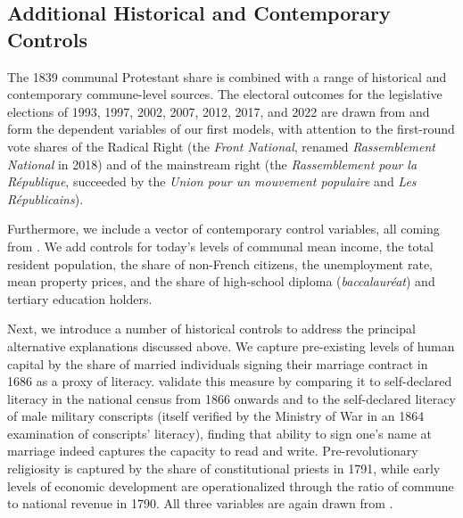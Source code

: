 \documentclass[12pt]{article}
\begin{document}
\subsection{Additional Historical and Contemporary Controls}

The 1839 communal Protestant share is combined with a range of historical and contemporary commune-level sources. The electoral outcomes for the legislative elections of 1993, 1997, 2002, 2007, 2012, 2017, and 2022 are drawn from \textcite{cageHistoryPoliticalConflict2025} and form the dependent variables of our first models, with attention to the first-round vote shares of the Radical Right (the \textit{Front National}, renamed \textit{Rassemblement National} in 2018) and of the mainstream right (the \textit{Rassemblement pour la République}, succeeded by the \textit{Union pour un mouvement populaire} and \textit{Les Républicains}). 

Furthermore, we include a vector of contemporary control variables, all coming from \textcite{cageHistoryPoliticalConflict2025}. We add controls for today's levels of communal mean income, the total resident population, the share of non-French citizens, the unemployment rate, mean property prices, and the share of high-school diploma (\textit{baccalauréat}) and tertiary education holders.

Next, we introduce a number of historical controls to address the principal alternative explanations discussed above. We capture pre-existing levels of human capital by the share of married individuals signing their marriage contract in 1686 as a proxy of literacy. \textcite[pp. 9-18]{furetReadingWritingLiteracy1983} validate this measure by comparing it to self-declared literacy in the national census from 1866 onwards and to the self-declared literacy of male military conscripts (itself verified by the Ministry of War in an 1864 examination of conscripts' literacy), finding that ability to sign one's name at marriage indeed captures the capacity to read and write. Pre-revolutionary religiosity is captured by the share of constitutional priests in 1791, while early levels of economic development are operationalized through the ratio of commune to national revenue in 1790. All three variables are again drawn from \textcite{cageHistoryPoliticalConflict2025}. 
\end{document}
